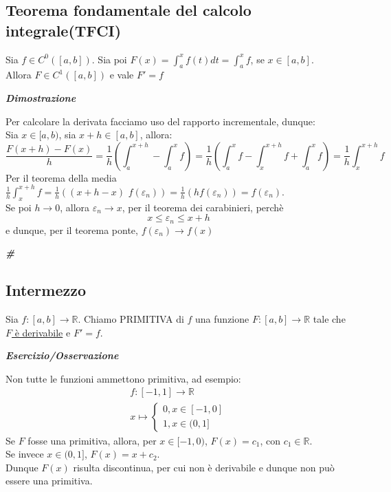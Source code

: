 \documentclass{article}
\theoremstyle{definition}
\newcommand{\R}{\mathbb{R}}
\newcommand{\cvd}{\begin{center} \textbf{\textit{\#}} \end{center}}
\begin{document}
\subsection{Teorema fondamentale del calcolo integrale(TFCI)}
Sia $f \in C^0([a,b])$. Sia poi $F(x)=\int_a^x f(t)dt=\int_a^xf$, se $x \in [a,b]$.
\\
Allora $F \in C^1([a,b])$ e vale $F'=f$
\begin{center}
    \textbf{\textit{Dimostrazione}}
\end{center}
Per calcolare la derivata facciamo uso del rapporto incrementale, dunque:
\\
Sia $x \in [a,b)$, sia $x+h \in [a,b]$, allora:
\begin{equation*}
    \frac{F(x+h)-F(x)}{h}=\frac{1}{h}\left(\int_a^{x+h}-\int_a^x f\right)=\frac{1}{h}\left(\int_a^x f- \int_x^{x+h} f + \int_a^{x}f\right)=\frac{1}{h}\int_x^{x+h}f
\end{equation*}
Per il teorema della media $\frac{1}{h}\int_x^{x+h} f =\frac{1}{h}\left((x+h-x) \,\, f(\varepsilon_n)\right)=\frac{1}{h}(h f(\varepsilon_n))=f(\varepsilon_n)$.
\\
Se poi $h \to 0$, allora $\varepsilon_n \to x$, per il teorema dei carabinieri, perchè
\begin{equation*}
    x \leqslant \varepsilon_n \leqslant x+h
\end{equation*}
e dunque, per il teorema ponte, $f(\varepsilon_n) \to f(x)$
\\
\cvd

\subsection{Intermezzo}
Sia $f:[a,b] \to \R$. Chiamo PRIMITIVA di $f$ una funzione $F: [a,b] \to \R$ tale che \underline{$F$ è derivabile} e \underline{$F'=f$}.
\\
\begin{center}
    \textbf{\textit{Esercizio/Osservazione}}
\end{center}
Non tutte le funzioni ammettono primitiva, ad esempio:
\begin{align*}
    f:[-1,1] \to \R  \\
    x \mapsto \begin{cases}
        0, x \in [-1,0] \\
        1, x \in (0,1]
    \end{cases}
\end{align*}
Se $F$ fosse una primitiva, allora, per $x \in [-1,0)$, $F(x)=c_1$, con $c_1 \in \R$.
\\
Se invece $x \in (0,1]$, $F(x)= x + c_2$.
\\
Dunque $F(x)$ risulta discontinua, per cui non è derivabile e dunque non può essere una primitiva.
\\
\end{document}

